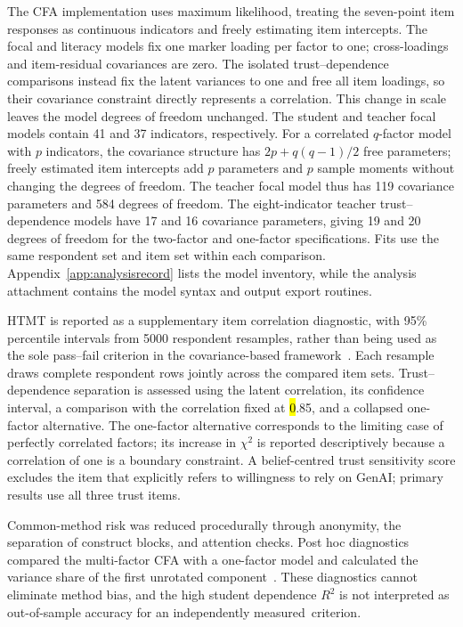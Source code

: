 \documentclass[sustainability,article,accept,moreauthors]{Definitions/mdpi}
\begin{document}
The CFA implementation uses maximum likelihood, treating the seven-point item responses as continuous indicators and freely estimating item intercepts. The focal and literacy models fix one marker loading per factor to one; cross-loadings and item-residual covariances are zero. The isolated trust--dependence comparisons instead fix the latent variances to one and free all item loadings, so their covariance constraint directly represents a correlation. This change in scale leaves the model degrees of freedom unchanged. The student and teacher focal models contain 41 and 37 indicators, respectively. For a correlated $q$-factor model with $p$ indicators, the covariance structure has $2p+q(q-1)/2$ free parameters; freely estimated item intercepts add $p$ parameters and $p$ sample moments without changing the degrees of freedom. The teacher focal model thus has 119 covariance parameters and 584 degrees of freedom. The eight-indicator teacher trust--dependence models have 17 and 16 covariance parameters, giving 19 and 20 degrees of freedom for the two-factor and one-factor specifications. Fits use the same respondent set and item set within each comparison. Appendix~\ref{app:analysisrecord} lists the model inventory, while the analysis attachment contains the model syntax and output export routines.

HTMT is reported as a supplementary item correlation diagnostic, with 95\% percentile intervals from 5000 respondent resamples, rather than being used as the sole pass--fail criterion in the covariance-based framework~\cite{henseler2015}. Each resample draws complete respondent rows jointly across the compared item sets. Trust--dependence separation is assessed using the latent correlation, its confidence interval, a comparison with the correlation fixed at \hl{0}.85, and a collapsed one-factor alternative. The one-factor alternative corresponds to the limiting case of perfectly correlated factors; its increase in $\chi^2$ is reported descriptively because a correlation of one is a boundary constraint. A belief-centred trust sensitivity score excludes the item that explicitly refers to willingness to rely on GenAI; primary results use all three trust items.

Common-method risk was reduced procedurally through anonymity, the separation of construct blocks, and attention checks. Post hoc diagnostics compared the multi-factor CFA with a one-factor model and calculated the variance share of the first unrotated component~\cite{podsakoff2003}. These diagnostics cannot eliminate method bias, and the high student dependence $R^2$ is not interpreted as out-of-sample accuracy for an independently measured~criterion.
\end{document}
